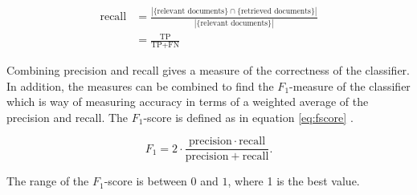 \begin{equation} \label{eq:recall} 
\begin{split}
\text{recall} & =\frac{|\{\text{relevant documents}\}\cap\{\text{retrieved documents}\}|}{|\{\text{relevant documents}\}|} \\
 & = \frac{\text{TP}}{\text{TP}+\text{FN}}
\end{split}
\end{equation}

Combining precision and recall gives a measure of the correctness of the classifier. In addition, the measures can be combined to find the $F_{1}$-measure of the classifier which is way of measuring accuracy in terms of a weighted average of the precision and recall. The $F_{1}$-score is defined as in equation \ref{eq:fscore} \cite{wiki:fscore}. 

\begin{equation} \label{eq:fscore}
F_1 = 2 \cdot \frac{\mathrm{precision} \cdot \mathrm{recall}}{\mathrm{precision} + \mathrm{recall}}.
\end{equation}

The range of the $F_{1}$-score is between $0$ and $1$, where 1 is the best value. 



\begin{comment}
Evaluation is the 


Kan også finne: 
p. 330 i iirbook. 
Rand index : measures the RI percentage of decisions that are correct. 
\end{comment}